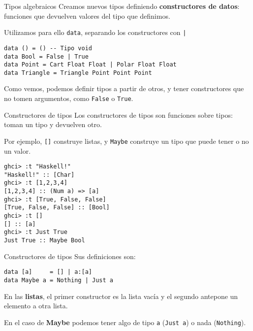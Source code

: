 \begin{frame}[fragile]{Tipos algebraicos}
  Creamos nuevos tipos definiendo \textbf{constructores de datos}: funciones que
  devuelven valores del tipo que definimos. %

  Utilizamos para ello \texttt{data}, separando los constructores con \texttt{|}

  \espacio

  \begin{lstlisting}
data () = () -- Tipo void
data Bool = False | True
data Point = Cart Float Float | Polar Float Float
data Triangle = Triangle Point Point Point
  \end{lstlisting}

  \espacio

  Como vemos, podemos definir tipos a partir de otros, y tener constructores que
  no tomen argumentos, como \texttt{False} o \texttt{True}.
\end{frame}

\begin{frame}[fragile]{Constructores de tipos}
  Los constructores de tipos son funciones sobre tipos: toman un tipo y devuelven otro.

  \espacio

  Por ejemplo, \texttt{[]} construye listas, y \texttt{Maybe} construye un tipo
  que puede tener o no un valor.

  \begin{lstlisting}
ghci> :t "Haskell!"
"Haskell!" :: [Char]
ghci> :t [1,2,3,4]
[1,2,3,4] :: (Num a) => [a]
ghci> :t [True, False, False]
[True, False, False] :: [Bool]
ghci> :t []
[] :: [a]
ghci> :t Just True
Just True :: Maybe Bool
  \end{lstlisting}
\end{frame}

\begin{frame}[fragile]{Constructores de tipos}
  Sus definiciones son:

  \espacio

  \begin{lstlisting}
data [a]     = [] | a:[a]
data Maybe a = Nothing | Just a
  \end{lstlisting}

  \espacio

  En las \textbf{listas}, el primer constructor es la lista vacía y
  el segundo antepone un elemento a otra lista.

  \espacio

  En el caso de \textbf{Maybe} podemos tener algo de tipo \texttt{a} (\texttt{Just a})
  o nada (\texttt{Nothing}).
\end{frame}

